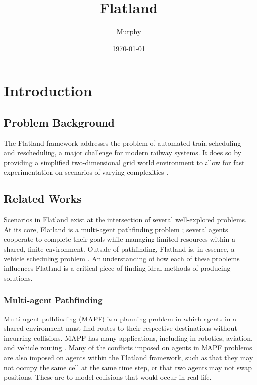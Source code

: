 \documentclass[11pt]{article}
\title{Flatland}
\author{Murphy}
\date{\today}
\begin{document}
\maketitle	
\pagebreak

\tableofcontents
\pagebreak


\section{Introduction}
\subsection{Problem Background}
The Flatland framework addresses the problem of automated train scheduling and rescheduling, a major challenge
for modern railway systems. It does so by providing a simplified two-dimensional grid world environment to allow for fast experimentation on scenarios of varying complexities \citep{monylascscbhwaegeibavistsasp20a}. 

\subsection{Related Works}
Scenarios in Flatland exist at the intersection of several well-explored problems.  At its core, Flatland is a multi-agent pathfinding problem \citep{silver05a}; several agents cooperate to complete their goals while managing limited resources within a shared, finite environment.  Outside of pathfinding, Flatland is, in essence, a vehicle scheduling problem \citep{bapeukfa00a}.  An understanding of how each of these problems influences Flatland is a critical piece of finding ideal methods of producing solutions.

\subsubsection{Multi-agent Pathfinding}
Multi-agent pathfinding (MAPF) \citep{silver05a} is a planning problem in which agents in a shared environment must find routes to their respective destinations without incurring collisions.  MAPF has many applications, including in robotics, aviation, and vehicle routing \citep{standley10a}.  Many of the conflicts imposed on agents in MAPF problems are also imposed on agents within the Flatland framework, such as that they may not occupy the same cell at the same time step, or that two agents may not swap positions.  These are to model collisions that would occur in real life.  
\end{document}
